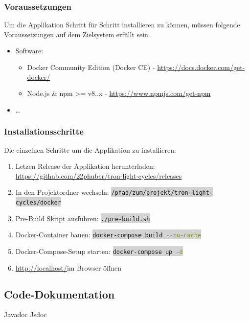 \documentclass[11pt,ngerman]{article}
\newcommand{\inlinecode}[2]{\colorbox{lightgray}{\lstinline[language=#1]$#2$}}
\begin{document}
    \subsubsection{Voraussetzungen}
    Um die Applikation Schritt für Schritt installieren zu können, müssen folgende Voraussetzungen auf dem Zielsystem erfüllt sein.
    \begin{itemize}
        \item Software:
            \begin{itemize}
                \item Docker Community Edition (Docker CE) - \url{https://docs.docker.com/get-docker/}
                \item Node.js \& npm >= v8..x - \url{https://www.npmjs.com/get-npm}
            \end{itemize}
        \item …
    \end{itemize}

    \subsubsection{Installationsschritte}
    Die einzelnen Schritte um die Applikation zu installieren:
    \begin{enumerate}
        \item Letzen Release der Applikation herunterladen: \url{https://github.com/22phuber/tron-light-cycles/releases}
        \item In den Projektordner wechseln: \inlinecode{bash}{/pfad/zum/projekt/tron-light-cycles/docker}
        \item Pre-Build Skript ausführen: \inlinecode{bash}{./pre-build.sh}
        \item \Gls{Docker}-Container bauen: \inlinecode{bash}{docker-compose build --no-cache}
        \item \Gls{Docker-Compose}-Setup starten: \inlinecode{bash}{docker-compose up -d}
        \item \url{http://localhost/}im Browser öffnen
    \end{enumerate}


    \subsection{Code-Dokumentation}
    Javadoc
    Jsdoc



\end{document}
